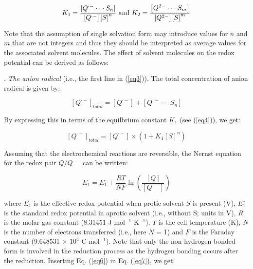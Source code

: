 \documentclass[byrevtex,amssymb,aps,pra,floatfix,letterpaper]{revtex4}
\begin{document}
\begin{equation}
K_1 = \frac{\left[Q^{\cdot-}\cdot\cdot\cdot S_n\right]}{\left[Q^{\cdot-}\right]\left[S\right]^n}\textnormal{ and }
K_2 = \frac{\left[Q^{2-}\cdot\cdot\cdot S_m\right]}{\left[Q^{2-}\right]\left[S\right]^m}
\label{eq4}
\end{equation}

\noindent
Note that the assumption of single solvation form may introduce values for $n$ and $m$ that are not integers and thus they should be interpreted as average values for the associated solvent molecules. The effect of solvent molecules on the redox potential can be derived as follows:

. \textit{The anion radical} (i.e., the first line in (\ref{eq3})). The total concentration of anion radical is given by:

\begin{equation}
\left[Q^{\cdot-}\right]_{total} = \left[Q^{\cdot-}\right] + \left[Q^{\cdot-}\cdot\cdot\cdot S_n\right]
\label{eq5}
\end{equation}

\noindent
By expressing this in terms of the equilbrium constant $K_1$ (see (\ref{eq4})), we get:

\begin{equation}
\left[Q^{\cdot-}\right]_{total} = \left[Q^{\cdot-}\right]\times\left(1 + K_1\left[S\right]^n\right)
\label{eq6}
\end{equation}

\noindent
Assuming that the electrochemical reactions are reversible, the Nernst equation for the redox pair $Q/Q^{\cdot-}$ can be written:

\begin{equation}
E_1 = E_1^\circ + \frac{RT}{NF}\ln\left(\frac{\left[Q\right]}{\left[Q^{\cdot-}\right]}\right)
\label{eq7}
\end{equation}

\noindent
where $E_1$ is the effective redox potential when protic solvent $S$ is present (V), $E_1^\circ$ is the standard redox potential in aprotic solvent (i.e., without S; units in V), $R$ is the molar gas constant (8.31451 J mol$^{-1}$ K$^{-1}$), $T$ is the cell temperature (K), $N$ is the number of electrons transferred (i.e., here $N$ = 1) and $F$ is the Faraday constant (9.648531 $\times$ $10^4$ C mol$^{-1}$). Note that only the non-hydrogen bonded form is involved in the reduction process as the hydrogen bonding occurs after the reduction. Inserting Eq. (\ref{eq6}) in Eq. (\ref{eq7}), we get:
\end{document}
